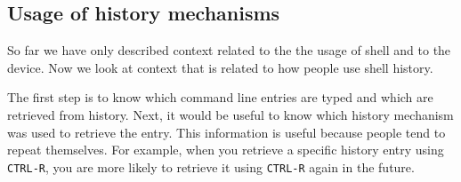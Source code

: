 \documentclass[thesis=M,english]{FITthesis}[2012/10/20]
\let\myCite\cite
\renewcommand\cite{\unskip~\myCite}
\begin{document}








\subsection{Usage of history mechanisms}

So far we have only described context related to the the usage of shell and to the device. Now we look at context that is related to how people use shell history. 

The first step is to know which command line entries are typed and which are retrieved from history. Next, it would be useful to know which history mechanism was used to retrieve the entry. This information is useful because people tend to repeat themselves. 
For example, when you retrieve a specific history entry using \verb|CTRL-R|, you are more likely to retrieve it using \verb|CTRL-R| again in the future. %
\end{document}
